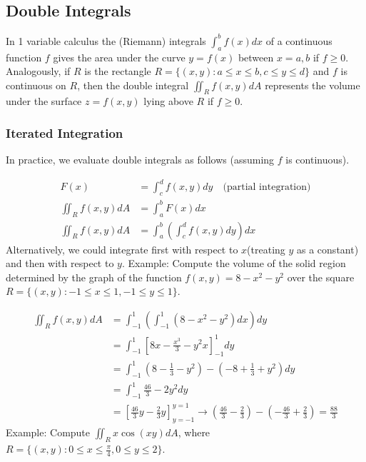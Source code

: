 \documentclass{article}
\newcommand{\nn}{\leavevmode \newline \newline} %
\numberwithin{equation}{subsection} %
\begin{document}
\subsection{Double Integrals}
In 1 variable calculus the (Riemann) integrals $\int_a^b f(x)dx$ of a continuous function $f$ gives the area under the curve $y=f(x)$ between $x=a,b$ if $f\geq0$. Analogously, if $R$ is the rectangle $R=\{(x,y): a\leq x \leq b, c\leq y \leq d \}$ and $f$ is continuous on $R$, then the double integral $\iint_R f(x,y) dA$ represents the volume under the surface $z=f(x,y)$ lying above $R$ if $f\geq0$.
\subsubsection{Iterated Integration}
In practice, we evaluate double integrals as follows (assuming $f$ is continuous).

\begin{equation}
    \begin{split}
        F(x) &=\int_c^d f(x,y) dy \quad (\text{partial integration)} \\
        \iint_R f(x,y) dA &= \int_a^b F(x) dx \\
        \iint_R f(x,y) dA &= \int_a^b \left(\int_c^d f(x,y)dy\right)dx
    \end{split}
\end{equation}
Alternatively, we could integrate first with respect to $x$(treating $y$ as a constant) and then with respect to $y$.
\nn
Example: Compute the volume of the solid region determined by the graph of the function $f(x,y)=8-x^2-y^2$ over the square $R=\{(x,y): -1 \leq x \leq 1, -1 \leq y \leq 1\}$.

\begin{equation}
    \begin{split}
        \iint_R f(x,y)dA &= \int_{-1}^1 \left(\int_{-1}^1 (8-x^2-y^2)dx\right)dy \\
        &= \int_{-1}^1 \left[ 8x-\frac{x^3}{3}-y^2x\right]_{-1}^1 dy \\
        &= \int_{-1}^1 (8-\frac{1}{3}-y^2) - (-8+\frac{1}{3}+y^2) dy \\
        &= \int_{-1}^1 \frac{46}{3}-2y^2 dy\\
        &= \left[ \frac{46}{3}y-\frac{2}{3}y\right]_{y=-1}^{y=1} \rightarrow \left(\frac{46}{3}-\frac{2}{3}\right) - \left( -\frac{46}{3}+\frac{2}{3}\right) = \frac{88}{3}
    \end{split}
\end{equation}
\nn
Example: Compute $\iint_R x\cos(xy)dA$, where $R=\{(x,y): 0 \leq x \leq \frac{\pi}{4}, 0 \leq y \leq 2 \}$.
\end{document}
